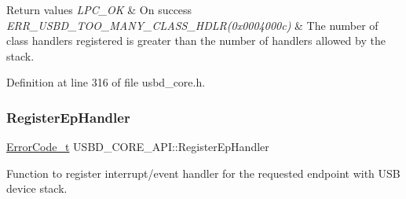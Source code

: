 \begin{DoxyRetVals}{Return values}
{\em L\+P\+C\+\_\+\+OK} & On success \\
\hline
{\em E\+R\+R\+\_\+\+U\+S\+B\+D\+\_\+\+T\+O\+O\+\_\+\+M\+A\+N\+Y\+\_\+\+C\+L\+A\+S\+S\+\_\+\+H\+D\+L\+R(0x0004000c)} & The number of class handlers registered is greater than the number of handlers allowed by the stack. \\
\hline
\end{DoxyRetVals}


Definition at line 316 of file usbd\+\_\+core.\+h.

\mbox{\label{struct_u_s_b_d___c_o_r_e___a_p_i_aae115addea44c865ee6e474740a9cf80}} 
\subsubsection{\texorpdfstring{Register\+Ep\+Handler}{RegisterEpHandler}}
{\footnotesize\ttfamily \hyperlink{error_8h_a905255056c349318139d94aa4523d516}{Error\+Code\+\_\+t} U\+S\+B\+D\+\_\+\+C\+O\+R\+E\+\_\+\+A\+P\+I\+::\+Register\+Ep\+Handler}

Function to register interrupt/event handler for the requested endpoint with U\+SB device stack.

